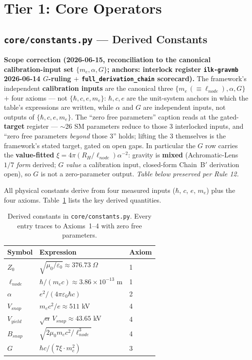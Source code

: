 \section{Tier 1: Core Operators}
\label{sec:tier1_core}

\subsection{\texttt{core/constants.py} --- Derived Constants}

\textbf{Scope correction (2026-06-15, reconciliation to the canonical calibration-input set $\{m_e, \alpha, G\}$; anchors: interlock register \texttt{ilk-gravmb} 2026-06-14 $G$-ruling $+$ \texttt{full\_derivation\_chain} scorecard).} The framework's independent \textbf{calibration inputs} are the canonical three $\{m_e \,(\equiv \ell_{node}), \alpha, G\}$ $+$ four axioms --- not $\{\hbar, c, e, m_e\}$: $\hbar, c, e$ are the unit-system anchors in which the table's expressions are written, while $\alpha$ and $G$ are independent inputs, not outputs of $\{\hbar, c, e, m_e\}$. The ``zero free parameters'' caption reads at the gated-\textbf{target} register --- $\sim$26 SM parameters reduce to those 3 interlocked inputs, and ``zero free parameters \emph{beyond} those 3'' holds; lifting the 3 themselves is the framework's stated target, gated on open gaps. In particular the $G$ row carries the \textbf{value-fitted} $\xi = 4\pi(R_H/\ell_{node})\alpha^{-2}$: gravity is \textbf{mixed} (Achromatic-Lens $1/7$ \emph{form} derived; $G$ \emph{value} a calibration input, closed-form Chain~B$'$ derivation open), so $G$ is not a zero-parameter output. \textit{Table below preserved per Rule 12.}

All physical constants derive from four measured inputs
($\hbar$, $c$, $e$, $m_e$) plus the four axioms.
Table~\ref{tab:engine_constants} lists the key derived quantities.

\begin{table}[H]
\centering\small
\caption{Derived constants in \texttt{core/constants.py}.
Every entry traces to Axioms~1--4 with zero free parameters.}
\label{tab:engine_constants}
\begin{tabular}{lll}
\toprule
\textbf{Symbol} & \textbf{Expression} & \textbf{Axiom} \\
\midrule
$Z_0$        & $\sqrt{\mu_0/\varepsilon_0} \approx 376.73\;\Omega$ & 1 \\
$\ell_{node}$ & $\hbar/(m_e c) \approx 3.86 \times 10^{-13}$ m     & 1 \\
$\alpha$      & $e^2/(4\pi\varepsilon_0\hbar c)$                    & 2 \\
$V_{snap}$    & $m_e c^2/e \approx 511$ kV                        & 4 \\
$V_{yield}$   & $\sqrt{\alpha}\,V_{snap} \approx 43.65$ kV          & 4 \\
$B_{snap}$    & $\sqrt{2\mu_0 m_e c^2 / \ell_{node}^3}$             & 4 \\
$G$           & $\hbar c / (7\xi \cdot m_e^2)$                      & 3 \\
\bottomrule
\end{tabular}
\end{table}



